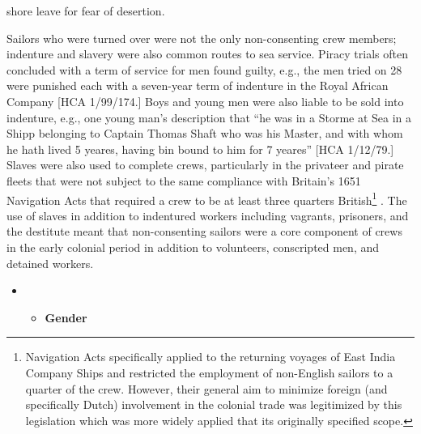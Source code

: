 shore leave for fear of desertion. 

Sailors who were turned over were not the only non-consenting crew members; indenture and slavery were also common routes to sea service. Piracy trials often concluded with a term of service for men found guilty, e.g., the men tried on 28 \citealt{March1722} were punished each with a seven-year term of indenture in the Royal African Company [HCA 1/99/174.] Boys and young men were also liable to be sold into indenture, e.g., one young man’s description that “he was in a Storme at Sea in a Shipp belonging to Captain Thomas Shaft who was his Master, and with whom he hath lived 5 yeares, having bin bound to him for 7 yeares” [HCA 1/12/79.] Slaves were also used to complete crews, particularly in the privateer and pirate fleets that were not subject to the same compliance with Britain's 1651 Navigation Acts that required a crew to be at least three quarters British\footnote{\citealt{The1651} Navigation Acts specifically applied to the returning voyages of East India Company Ships and restricted the employment of non-English sailors to a quarter of the crew. However, their general aim to minimize foreign (and specifically Dutch) involvement in the colonial trade was legitimized by this legislation which was more widely applied that its originally specified scope.} . The use of slaves in addition to indentured workers including vagrants, prisoners, and the destitute meant that non-consenting sailors were a core component of crews in the early colonial period in addition to volunteers, conscripted men, and detained workers. 

\setcounter{itemize}{2}
\begin{itemize}
\item \setcounter{itemize}{2}
\begin{itemize}
\item \begin{styleListParagraph}
\textbf{Gender}
\end{styleListParagraph}
\end{itemize}
\end{itemize}

